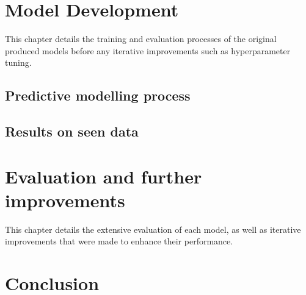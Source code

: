 \documentclass[12pt]{report}
\begin{document}
\chapter{Model Development} %
This chapter details the training and evaluation processes of the original produced models
before any iterative improvements such as hyperparameter tuning.

\section{Predictive modelling process}

\section{Results on seen data}

\chapter{Evaluation and further improvements}
This chapter details the extensive evaluation of each model, as well as iterative improvements 
that were made to enhance their performance.


\chapter{Conclusion}

\end{document}
